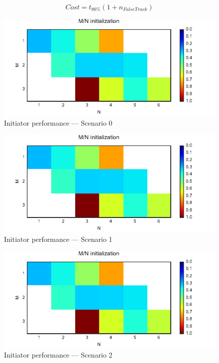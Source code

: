 \begin{equation}\label{eq:init_score_function}
Cost = t_{80\%} (1 + n_{False Track})
\end{equation}
\begin{figure}[H]
 \centering
 \includegraphics{Figures/plots/Scenario0_Init-Performance.pdf}
 \caption{Initiator performance --- Scenario 0}\label{fig:init_performance_scenario0}
\end{figure}
\begin{figure}
 \centering
 \includegraphics{Figures/plots/Scenario1_Init-Performance.pdf}
 \caption{Initiator performance --- Scenario 1}\label{fig:init_performance_scenario1}
\end{figure}
\begin{figure}
 \centering
 \includegraphics{Figures/plots/Scenario2_Init-Performance.pdf}
 \caption{Initiator performance --- Scenario 2}\label{fig:init_performance_scenario2}
\end{figure}

